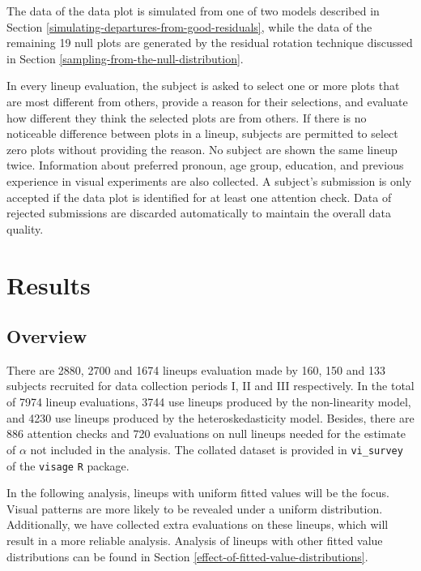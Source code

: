 \documentclass[]{interact}
\theoremstyle{plain}%
\theoremstyle{definition}
\theoremstyle{remark}
\begin{document}
The data of the data plot is simulated from one of two models described
in Section \ref{simulating-departures-from-good-residuals}, while the
data of the remaining 19 null plots are generated by the residual
rotation technique discussed in Section
\ref{sampling-from-the-null-distribution}.

In every lineup evaluation, the subject is asked to select one or more
plots that are most different from others, provide a reason for their
selections, and evaluate how different they think the selected plots are
from others. If there is no noticeable difference between plots in a
lineup, subjects are permitted to select zero plots without providing
the reason. No subject are shown the same lineup twice. Information
about preferred pronoun, age group, education, and previous experience
in visual experiments are also collected. A subject's submission is only
accepted if the data plot is identified for at least one attention
check. Data of rejected submissions are discarded automatically to
maintain the overall data quality.

\hypertarget{results}{%
\section{Results}\label{results}}

\hypertarget{overview}{%
\subsection{Overview}\label{overview}}

There are 2880, 2700 and 1674 lineups evaluation made by 160, 150 and
133 subjects recruited for data collection periods I, II and III
respectively. In the total of 7974 lineup evaluations, 3744 use lineups
produced by the non-linearity model, and 4230 use lineups produced by
the heteroskedasticity model. Besides, there are 886 attention checks
and 720 evaluations on null lineups needed for the estimate of
\(\alpha\) not included in the analysis. The collated dataset is
provided in \texttt{vi\_survey} of the \texttt{visage} \texttt{R}
package.

In the following analysis, lineups with uniform fitted values will be
the focus. Visual patterns are more likely to be revealed under a
uniform distribution. Additionally, we have collected extra evaluations
on these lineups, which will result in a more reliable analysis.
Analysis of lineups with other fitted value distributions can be found
in Section \ref{effect-of-fitted-value-distributions}.
\end{document}

